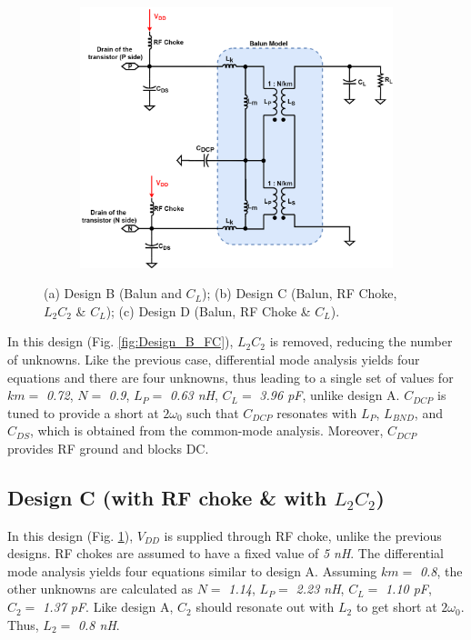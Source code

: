 \documentclass[conference]{IEEEtran}
\begin{document}
\begin{figure}[!t]
\begin{subfigure}{0.24\textwidth}
\caption{}
\label{fig:Design_C_FC}
\end{subfigure}
\begin{subfigure}{0.24\textwidth}
\includegraphics[width=1\textwidth]{Images/Design/Design_D_FC.png}
\caption{}
\label{fig:Design_D_FC}
\end{subfigure}
\caption{(a) Design B (Balun and $C_L$); (b) Design C (Balun, RF Choke, $L_2C_2$ \& $C_L$); (c) Design D (Balun, RF Choke \& $C_L$).}
\label{fig:Design_B_C_D}
\vspace{-0.25in}
\end{figure}

In this design (Fig. \ref{fig:Design_B_FC}), $L_2C_2$ is removed, \color{blue} reducing \color{black} the number of unknowns. Like the previous case, differential mode analysis yields four equations and there are four unknowns, thus leading to a single set of values for $km =$ \textit{0.72}, $N =$ \textit{0.9}, $L_P =$ \textit{0.63 nH}, $C_L =$ \textit{3.96 pF}, unlike design A. $C_{DCP}$ is tuned to provide a short at $2\omega_0$ such that $C_{DCP}$ resonates with $L_P$, $L_{BND}$, and $C_{DS}$, which is obtained from the common-mode analysis. Moreover, $C_{DCP}$ provides RF ground and blocks DC.

\subsection{Design C (with RF choke \& with $L_2C_2$)}
In this design (Fig. \ref{fig:Design_C_FC}), $V_{DD}$ is supplied through RF choke, unlike the previous designs. RF chokes are assumed to have a fixed value of \textit{5 nH}. The differential mode analysis yields four equations similar to design A. Assuming $km =$ \textit{0.8}, the other unknowns are calculated as $N =$ \textit{1.14}, $L_P =$ \textit{2.23 nH}, $C_L =$ \textit{1.10 pF}, $C_2 =$ \textit{1.37 pF}.
Like design A, $C_2$ should resonate out with $L_2$ to get short at $2\omega_0$. Thus, $L_2 =$ \textit{0.8 nH}. 
\end{document}
